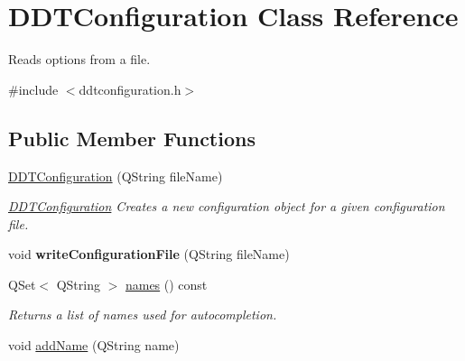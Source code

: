\hypertarget{classDDTConfiguration}{\section{D\-D\-T\-Configuration Class Reference}
\label{classDDTConfiguration}
}


Reads options from a file.  




{\ttfamily \#include $<$ddtconfiguration.\-h$>$}

\subsection*{Public Member Functions}
\begin{DoxyCompactItemize}
\item 
\hyperlink{classDDTConfiguration_aa8b20f6bcfe2b3ddf61b96f2bab59cca}{D\-D\-T\-Configuration} (Q\-String file\-Name)
\begin{DoxyCompactList}\small\item\em \hyperlink{classDDTConfiguration}{D\-D\-T\-Configuration} Creates a new configuration object for a given configuration file. \end{DoxyCompactList}\item 
\hypertarget{classDDTConfiguration_a581c7466f9b308272470c1699601cf36}{void {\bfseries write\-Configuration\-File} (Q\-String file\-Name)}\label{classDDTConfiguration_a581c7466f9b308272470c1699601cf36}

\item 
Q\-Set$<$ Q\-String $>$ \hyperlink{classDDTConfiguration_a5124fbeb717acce377a1fbf8218b6d6d}{names} () const 
\begin{DoxyCompactList}\small\item\em Returns a list of names used for autocompletion. \end{DoxyCompactList}\item 
\hypertarget{classDDTConfiguration_ae74e28f9991535f8ff9af2c698c42cd4}{void \hyperlink{classDDTConfiguration_ae74e28f9991535f8ff9af2c698c42cd4}{add\-Name} (Q\-String name)}\label{classDDTConfiguration_ae74e28f9991535f8ff9af2c698c42cd4}


\end{DoxyCompactItemize}
